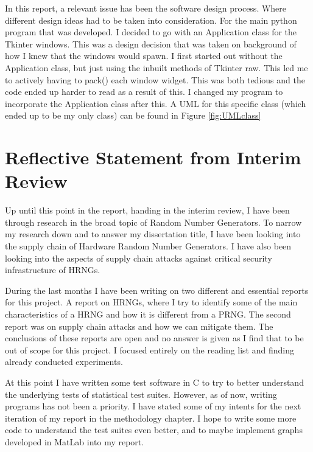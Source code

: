 \documentclass[]{final_report}
\begin{document}
\par{In this report, a relevant issue has been the software design process. Where different design ideas had to be taken into consideration. For the main python program that was developed. I decided to go with an Application class for the Tkinter windows. This was a design decision that was taken on background of how I knew that the windows would spawn. I first started out without the Application class, but just using the inbuilt methods of Tkinter raw. This led me to actively having to pack() each window widget. This was both tedious and the code ended up harder to read as a result of this. I changed my program to incorporate the Application class after this. A UML for this specific class (which ended up to be my only class) can be found in Figure \ref{fig:UMLclass}}
	
\chapter*{Reflective Statement from Interim Review}

\par{Up until this point in the report, handing in the interim review, I have been through research in the broad topic of Random Number Generators. To narrow my research down and to answer my dissertation title, I have been looking into the supply chain of Hardware Random Number Generators. I have also been looking into the aspects of supply chain attacks against critical security infrastructure of HRNGs.}

\par{During the last months I have been writing on two different and essential reports for this project. A report on HRNGs, where I try to identify some of the main characteristics of a HRNG and how it is different from a PRNG. The second report was on supply chain attacks and how we can mitigate them. The conclusions of these reports are open and no answer is given as I find that to be out of scope for this project. I focused entirely on the reading list and finding already conducted experiments.}

\par{At this point I have written some test software in C to try to better understand the underlying tests of statistical test suites. However, as of now, writing programs has not been a priority. I have stated some of my intents for the next iteration of my report in the methodology chapter. I hope to write some more code to understand the test suites even better, and to maybe implement graphs developed in MatLab into my report.}
\end{document}
